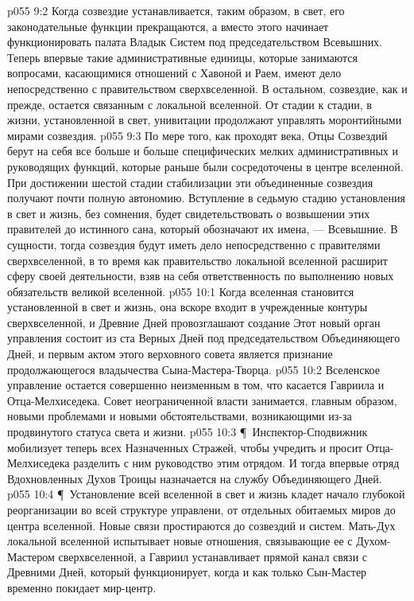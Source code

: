 \vs p055 9:2 Когда созвездие устанавливается, таким образом, в свет, его законодательные функции прекращаются, а вместо этого начинает функционировать палата Владык Систем под председательством Всевышних. Теперь впервые такие административные единицы, которые занимаются вопросами, касающимися отношений с Хавоной и Раем, имеют дело непосредственно с правительством сверхвселенной. В остальном, созвездие, как и прежде, остается связанным с локальной вселенной. От стадии к стадии, в жизни, установленной в свет, унивитации продолжают управлять моронтийными мирами созвездия.
\vs p055 9:3 По мере того, как проходят века, Отцы Созвездий берут на себя все больше и больше специфических мелких административных и руководящих функций, которые раньше были сосредоточены в центре вселенной. При достижении шестой стадии стабилизации эти объединенные созвездия получают почти полную автономию. Вступление в седьмую стадию установления в свет и жизнь, без сомнения, будет свидетельствовать о возвышении этих правителей до истинного сана, который обозначают их имена, --- Всевышние. В сущности, тогда созвездия будут иметь дело непосредственно с правителями сверхвселенной, в то время как правительство локальной вселенной расширит сферу своей деятельности, взяв на себя ответственность по выполнению новых обязательств великой вселенной.
\vs p055 10:1 Когда вселенная становится установленной в свет и жизнь, она вскоре входит в учрежденные контуры сверхвселенной, и Древние Дней провозглашают создание  Этот новый орган управления состоит из ста Верных Дней под председательством Объединяющего Дней, и первым актом этого верховного совета является признание продолжающегося владычества Сына\hyp{}Мастера\hyp{}Творца.
\vs p055 10:2 Вселенское управление остается совершенно неизменным в том, что касается Гавриила и Отца\hyp{}Мелхиседека. Совет неограниченной власти занимается, главным образом, новыми проблемами и новыми обстоятельствами, возникающими из\hyp{}за продвинутого статуса света и жизни.
\vs p055 10:3 \P\ Инспектор\hyp{}Сподвижник мобилизует теперь всех Назначенных Стражей, чтобы учредить  и просит Отца\hyp{}Мелхиседека разделить с ним руководство этим отрядом. И тогда впервые отряд Вдохновленных Духов Троицы назначается на службу Объединяющего Дней.
\vs p055 10:4 \P\ Установление всей вселенной в свет и жизнь кладет начало глубокой реорганизации во всей структуре управлени, от отдельных обитаемых миров до центра вселенной. Новые связи простираются до созвездий и систем. Мать\hyp{}Дух локальной вселенной испытывает новые отношения, связывающие ее с Духом\hyp{}Мастером сверхвселенной, а Гавриил устанавливает прямой канал связи с Древними Дней, который функционирует, когда и как только Сын\hyp{}Мастер временно покидает мир\hyp{}центр.
